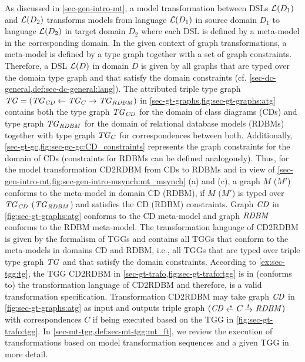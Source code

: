 \begin{remark}
As discussed in \cref{sec-gen-intro-mt}, a model transformation between DSLs $\mathcal{L}(D_1)$ and $\mathcal{L}(D_2)$ transforms models from language $\mathcal{L}(D_1)$ in source domain $D_1$ to language $\mathcal{L}(D_2)$ in target domain $D_2$ where each DSL is defined by a meta-model in the corresponding domain.
In the given context of graph transformations, a meta-model is defined by a type graph together with a set of graph constraints.
Therefore, a DSL $\mathcal{L}(D)$ in domain $D$ is given by all graphs that are typed over the domain type graph and that satisfy the domain constraints (cf. \cref{sec-dc-general,def:sec-dc-general:lang}).
The attributed triple type graph $\mathit{TG}=(\mathit{TG}_\mathit{CD} \gets \mathit{TG}_C \to \mathit{TG}_\mathit{RDBM})$ in \cref{sec-gt-graphs,fig:sec-gt-graphs:atg} contains both the type graph $\mathit{TG}_\mathit{CD}$ for the domain of class diagrams (CDs) and type graph $\mathit{TG}_\mathit{RDBM}$ for the domain of relational database models (RDBMs) together with type graph $\mathit{TG}_C$ for correspondences between both.
Additionally, \cref{sec-gt-gc,fig:sec-gc-gc:CD_constraints} represents the graph constraints for the domain of CDs (constraints for RDBMs can be defined analogously).
Thus, for the model transformation CD2RDBM from CDs to RDBMs and in view of \cref{sec-gen-intro-mt,fig:sec-gen-intro-msynch:mt_msynch} (a) and (c), a graph $M$ ($M'$) conforms to the meta-model in domain CD (RDBM), if $M$ ($M'$) is typed over $\mathit{TG}_\mathit{CD}$ ($\mathit{TG}_\mathit{RDBM}$) and satisfies the CD (RDBM) constraints.
Graph $\mathit{CD}$ in \cref{fig:sec-gt-graphs:atg} conforms to the CD meta-model and graph $\mathit{RDBM}$ conforms to the RDBM meta-model.
The transformation language of CD2RDBM is given by the formalism of TGGs and contains all TGGs that conform to the meta-models in domains CD and RDBM, i.e., all TGGs that are typed over triple type graph $\mathit{TG}$ and that satisfy the domain constraints.
According to \cref{ex:sec-tgg:tg}, the TGG CD2RDBM in \cref{sec-gt-trafo,fig:sec-gt-trafo:tgg} is in (conforms to) the transformation language of CD2RDBM and therefore, is a valid transformation specification.
Transformation CD2RDBM may take graph $\mathit{CD}$ in \cref{fig:sec-gt-graphs:atg} as input and outputs triple graph $(\CD \transB{s} C \trans{t} \RDBM)$ with correspondences $C$ if being executed based on the TGG in \cref{fig:sec-gt-trafo:tgg}.
In \cref{sec-mt-tgg,def:sec-mt-tgg:mt_ft}, we review the execution of transformations based on model transformation sequences and a given TGG in more detail.
\envEndMarker
\end{remark}
